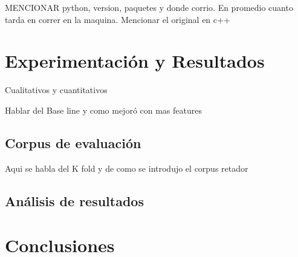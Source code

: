 \documentclass[letterpaper,12pt,oneside]{book}
\begin{document}
MENCIONAR python, version, paquetes y donde corrio. En promedio cuanto tarda
en correr en la maquina. Mencionar el original en c++


\chapter{Experimentación y Resultados}

Cualitativos y cuantitativos

Hablar del Base line y como mejoró con mas features

\section{Corpus de evaluación}

Aqui se habla del K fold y de como se introdujo el corpus retador

\citet{singh2005comparison}

\section{Análisis de resultados}

\chapter{Conclusiones}



\end{document}
